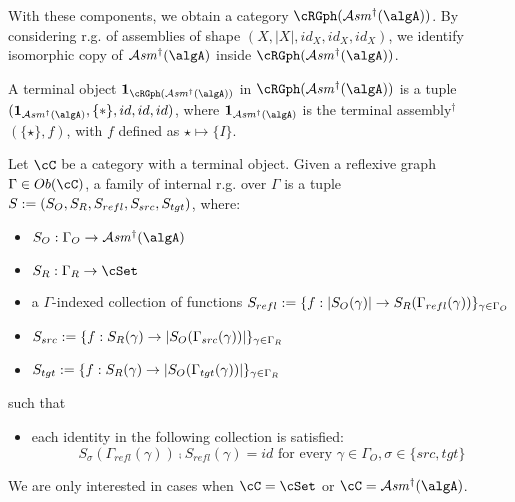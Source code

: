 \documentclass[12pt,a4paper]{article}
\def\cAsm{\mathcal{A}\mathit{sm}^\dagger}
\def\src{_{src}}\alwaysmath{src}
\def\rfl{_{refl}}\alwaysmath{rfl}
\def\tgt{_{tgt}}\alwaysmath{tgt}
\renewcommand{\O}{_{O}}
\newcommand{\R}{\ensuremath{_{R}}}
\begin{document}
With these components, we obtain a category $\cRGph(\cAsm(\algA))$. By considering r.g. of assemblies of shape $(X,|X|,id_X,id_X,id_X)$, we identify isomorphic copy of $\cAsm(\algA)$ inside $\cRGph(\cAsm(\algA))$.

A terminal object $\mathbf{1}_{\cRGph(\cAsm(\algA))}$ in $\cRGph(\cAsm(\algA))$ is a tuple $(\mathbf{1}_{\cAsm(\algA)}, \{*\}, id, id, id)$, where $\mathbf{1}_{\cAsm(\algA)}$ is the terminal assembly$^\dagger$ $(\{\star\},f)$, with $f$ defined as $\star \mapsto \{I\}$.

\begin{definition}
  \label{def:fam-refl-graphs}
  Let $\cC$ be a category with a terminal object. Given a reflexive graph $\Gamma \in \ob\cC$, a family of internal r.g. over $\Gamma$ is a tuple $S\define(S_O, S_R, S\rfl, S\src, S\tgt)$, where:
  \begin{itemize}[noitemsep]
    \item $S\O : \Gamma\O \to \cAsm(\algA)$
    \item $S\R : \Gamma\R \to \cSet$
    \item a $\Gamma$-indexed collection of functions $S\rfl \define \{f: \carr{S\O(\gamma)} \to S\R(\Gamma\rfl(\gamma)) \}_{\gamma \in \Gamma\O}$
    \item $S\src \define \{f: S\R(\gamma) \to \carr{S\O(\Gamma\src(\gamma))} \}_{\gamma \in \Gamma\R}$
    \item $S\tgt \define \{f: S\R(\gamma) \to \carr{S\O(\Gamma\tgt(\gamma))} \}_{\gamma \in \Gamma\R}$ 
  \end{itemize}
  such that 
  \begin{itemize}[noitemsep]
    \item each identity in the following collection is satisfied:
     $$S_\sigma(\Gamma\rfl(\gamma)) \comp S\rfl(\gamma) = id \text{ for every } \gamma \in \Gamma\O, \sigma \in \{src, tgt \}$$
  \end{itemize}

\end{definition}
We are only interested in cases when $\cC = \cSet$ or $\cC = \cAsm(\algA)$. 
\end{document}
